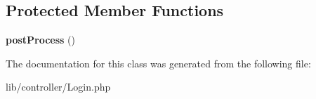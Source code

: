 \subsection*{Protected Member Functions}
\begin{DoxyCompactItemize}
\item 
{\bfseries post\+Process} ()\hypertarget{class_my_app_1_1_controller_1_1_login_a2ce27ddc079690184240b34c12d541fb}{}\label{class_my_app_1_1_controller_1_1_login_a2ce27ddc079690184240b34c12d541fb}

\end{DoxyCompactItemize}


The documentation for this class was generated from the following file\+:\begin{DoxyCompactItemize}
\item 
lib/controller/Login.\+php\end{DoxyCompactItemize}
